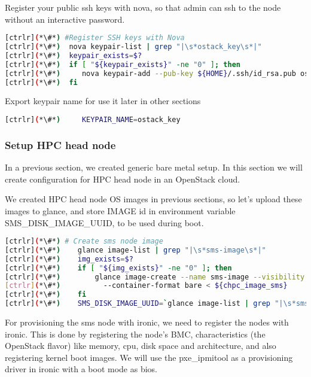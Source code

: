 	Register your public ssh keys with nova, so that admin can ssh to the node without an interactive password.


\begin{lstlisting}[language=bash,keywords={}]
[ctrlr](*\#*) #Register SSH keys with Nova
[ctrlr](*\#*)  nova keypair-list | grep "|\s*ostack_key\s*|"
[ctrlr](*\#*)  keypair_exists=$?
[ctrlr](*\#*)  if [ "${keypair_exists}" -ne "0" ]; then
[ctrlr](*\#*)     nova keypair-add --pub-key ${HOME}/.ssh/id_rsa.pub ostack_key
[ctrlr](*\#*)  fi
\end{lstlisting} 

	Export keypair name for use it later in other sections


\begin{lstlisting}[language=bash,keywords={}]
[ctrlr](*\#*)     KEYPAIR_NAME=ostack_key
\end{lstlisting} 
\newpage
\subsubsection{Setup HPC head node}


	In a previous section, we created generic bare metal setup. In this section we will create configuration for HPC head node in an OpenStack cloud.
	
	We created HPC head node OS images in previous sections, so let's upload these images to glance, and store IMAGE id in environment variable SMS\_DISK\_IMAGE\_UUID, to be used during boot. 

\begin{lstlisting}[language=bash,keywords={}]
[ctrlr](*\#*) # Create sms node image
[ctrlr](*\#*)    glance image-list | grep "|\s*sms-image\s*|"
[ctrlr](*\#*)    img_exists=$?
[ctrlr](*\#*)    if [ "${img_exists}" -ne "0" ]; then
[ctrlr](*\#*)        glance image-create --name sms-image --visibility public --disk-format qcow2 \
[ctrlr](*\#*)          --container-format bare < ${chpc_image_sms}
[ctrlr](*\#*)    fi
[ctrlr](*\#*)    SMS_DISK_IMAGE_UUID=`glance image-list | grep "|\s*sms-image\s*|" | awk '{print $2}'`
\end{lstlisting} 

	For provisioning the sms node with ironic, we need to register the nodes with ironic. This is done by registering the node's BMC, characteristics (the OpenStack flavor) like memory, cpu, disk space and architecture, and also registering kernel boot images. We will use the pxe\_ipmitool as a provisioning driver in ironic with a boot mode as bios.

